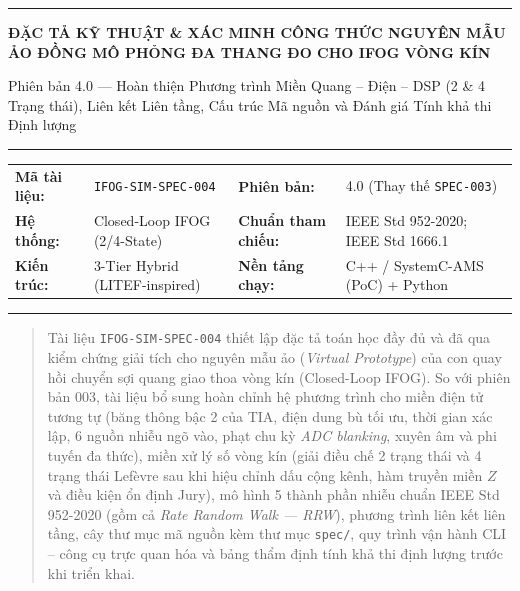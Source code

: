 \documentclass[11pt, a4paper]{article}
\begin{document}
\thispagestyle{plain}
{\color{primaryblue}\rule{\textwidth}{1.5pt}}
\vspace{0.3cm}

{\Large\bfseries\color{primaryblue} ĐẶC TẢ KỸ THUẬT \& XÁC MINH CÔNG THỨC NGUYÊN MẪU ẢO ĐỒNG MÔ PHỎNG ĐA THANG ĐO CHO IFOG VÒNG KÍN}

\vspace{0.15cm}
{\normalsize\color{mutedgray} Phiên bản 4.0 --- Hoàn thiện Phương trình Miền Quang -- Điện -- DSP (2 \& 4 Trạng thái), Liên kết Liên tầng, Cấu trúc Mã nguồn và Đánh giá Tính khả thi Định lượng}

\vspace{0.2cm}
{\color{rulegray}\rule{\textwidth}{0.6pt}}
\vspace{0.15cm}

\begin{tabular}{@{}l L{4.7cm} l L{4.9cm}@{}}
\textbf{Mã tài liệu:} & \texttt{IFOG-SIM-SPEC-004} & \textbf{Phiên bản:} & 4.0 (Thay thế \texttt{SPEC-003}) \\
\textbf{Hệ thống:} & Closed-Loop IFOG (2/4-State) & \textbf{Chuẩn tham chiếu:} & IEEE Std 952-2020; IEEE Std 1666.1 \\
\textbf{Kiến trúc:} & 3-Tier Hybrid (LITEF-inspired) & \textbf{Nền tảng chạy:} & C++ / SystemC-AMS (PoC) + Python \\
\end{tabular}

\vspace{0.15cm}
{\color{primaryblue}\rule{\textwidth}{1.0pt}}
\vspace{0.25cm}

\begin{abstract}
\noindent Tài liệu \texttt{IFOG-SIM-SPEC-004} thiết lập đặc tả toán học đầy đủ và đã qua kiểm chứng giải tích cho nguyên mẫu ảo (\emph{Virtual Prototype}) của con quay hồi chuyển sợi quang giao thoa vòng kín (Closed-Loop IFOG). So với phiên bản 003, tài liệu bổ sung hoàn chỉnh hệ phương trình cho miền điện tử tương tự (băng thông bậc 2 của TIA, điện dung bù tối ưu, thời gian xác lập, 6 nguồn nhiễu ngõ vào, phạt chu kỳ \emph{ADC blanking}, xuyên âm và phi tuyến đa thức), miền xử lý số vòng kín (giải điều chế 2 trạng thái và 4 trạng thái Lefèvre sau khi hiệu chỉnh dấu cộng kênh, hàm truyền miền $Z$ và điều kiện ổn định Jury), mô hình 5 thành phần nhiễu chuẩn IEEE Std 952-2020 (gồm cả \emph{Rate Random Walk --- RRW}), phương trình liên kết liên tầng, cây thư mục mã nguồn kèm thư mục \texttt{spec/}, quy trình vận hành CLI -- công cụ trực quan hóa và bảng thẩm định tính khả thi định lượng trước khi triển khai.
\end{abstract}
\end{document}
